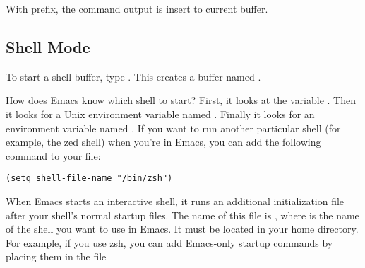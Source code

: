 With  prefix, the command output is insert to current buffer.

\subsection{Shell Mode}
\label{sec:shell-mode}

To start a shell buffer, type .
This creates a buffer named .



How does Emacs know which shell to start?
First, it looks at the variable .
Then it looks for a Unix environment variable named .
Finally it looks for an environment variable named .
If you want to run another particular shell (for example, the zed shell) when you’re in Emacs, you can add the following command to your  file:
\begin{lstlisting}
(setq shell-file-name "/bin/zsh")
\end{lstlisting}


When Emacs starts an interactive shell, it runs an additional initialization file after your shell’s normal startup files.
The name of this file is , where  is the name of the shell you want to use in Emacs.
It must be located in your home directory.
For example, if you use zsh, you can add Emacs-only startup commands by placing them in the file 

